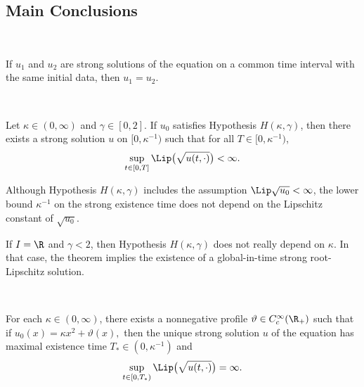 \subsection{Main Conclusions}

\begin{theorem}\ \par
If $u_1$ and $u_2$ are strong solutions of the equation on a common time interval with the same initial data, then
\(
    u_1=u_2.
\)
\end{theorem}

\begin{theorem}\ \par
Let $\kappa\in(0,\infty)$ and $\gamma\in[0,2]$. If $u_0$ satisfies Hypothesis $H(\kappa,\gamma)$, then there exists a strong solution $u$ on $[0,\kappa^{-1})$ such that for all $T\in[0,\kappa^{-1})$,
\[
    \sup_{t\in[0,T]} \Lip\bigl(\sqrt{u(t,\cdot)}\bigr)<\infty.
\]
\end{theorem}

\begin{remark}
Although Hypothesis $H(\kappa,\gamma)$ includes the assumption $\Lip\sqrt{u_0}<\infty$, the lower bound $\kappa^{-1}$ on the strong existence time does not depend on the Lipschitz constant of $\sqrt{u_0}$.
\end{remark}

\begin{remark}
If $I=\R$ and $\gamma<2$, then Hypothesis $H(\kappa,\gamma)$ does not really depend on $\kappa$. In that case, the theorem implies the existence of a global-in-time strong root-Lipschitz solution.
\end{remark}

\begin{theorem}\ \par
For each $\kappa\in(0,\infty)$, there exists a nonnegative profile
\(
    \vartheta\in C_c^{\infty}(\R_+)
\)
such that if
\(
    u_0(x)=\kappa x^2+\vartheta(x),
\)
then the unique strong solution $u$ of the equation has maximal existence time
\(
    T_*\in(0,\kappa^{-1})
\)
and
\[
    \sup_{t\in[0,T_*)}\Lip\bigl(\sqrt{u(t,\cdot)}\bigr)=\infty.
\]
\end{theorem}
